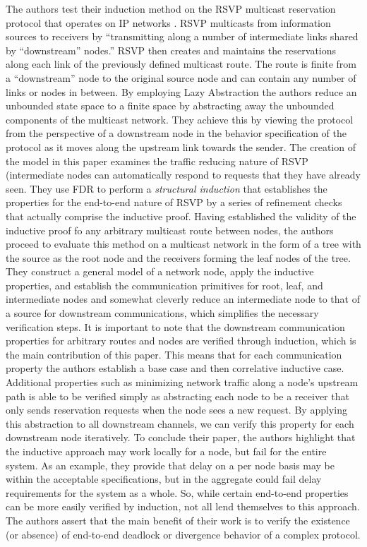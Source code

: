 \documentclass[12pt, fullpage]{article}
\begin{document}
\bigbreak
The authors test their induction method on the RSVP multicast reservation protocol that operates on IP networks \cite{rfc2205}. RSVP multicasts from information sources to receivers by ``transmitting along a number of intermediate links shared by ``downstream'' nodes.'' RSVP then creates and maintains the reservations along each link of the previously defined multicast route. The route is finite from a ``downstream'' node to the original source node and can contain any number of links or nodes in between.
\bigbreak
By employing Lazy Abstraction the authors reduce an unbounded state space to a finite space by abstracting away the unbounded components of the multicast network. They achieve this by viewing the protocol from the perspective of a downstream node in the behavior specification of the protocol as it moves along the upstream link towards the sender.
\bigbreak
The creation of the model in this paper examines the traffic reducing nature of RSVP (intermediate nodes can automatically respond to requests that they have already seen. They use FDR to perform a \textit{structural induction} that establishes the properties for the end-to-end nature of RSVP by a series of refinement checks that actually comprise the inductive proof. Having established the validity of the inductive proof fo any arbitrary multicast route between nodes, the authors proceed to evaluate this method on a multicast network in the form of a tree with the source as the root node and the receivers forming the leaf nodes of the tree. They construct a general model of a network node, apply the inductive properties, and establish the communication primitives for root, leaf, and intermediate nodes and somewhat cleverly reduce an intermediate node to that of a source for downstream communications, which simplifies the necessary verification steps. It is important to note that the downstream communication properties for arbitrary routes and nodes are verified through induction, which is the main contribution of this paper. This means that for each communication property the authors establish a base case and then correlative inductive case. Additional properties such as minimizing network traffic along a node's upstream path is able to be verified simply as abstracting each node to be a receiver that only sends reservation requests when the node sees a new request. By applying this abstraction to all downstream channels, we can verify this property for each downstream node iteratively.
\bigbreak
To conclude their paper, the authors highlight that the inductive approach may work locally for a node, but fail for the entire system. As an example, they provide that delay on a per node basis may be within the acceptable specifications, but in the aggregate could fail delay requirements for the system as a whole. So, while certain end-to-end properties can be more easily verified by induction, not all lend themselves to this approach. The authors assert that the main benefit of their work is to verify the existence (or absence) of end-to-end deadlock or divergence behavior of a complex protocol. 
\end{document}
